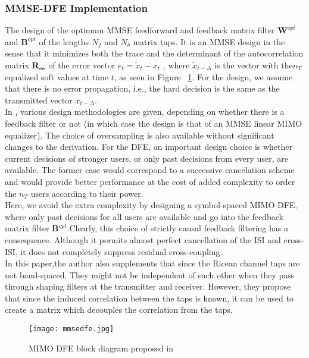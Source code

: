 \subsubsection{MMSE-DFE Implementation}
The design of the optimum MMSE feedforward and feedback matrix filter $\boldsymbol{W}^{opt}$ and $\boldsymbol{B}^{opt}$ of the lengths $N_f$ and $N_b$ matrix taps.
It is an MMSE design in the sense that it minimizes both the trace and the determinant of the autocorrelation matrix $\boldsymbol{R} _{\boldsymbol{ee}}$ of the error vector $e_t = \tilde{x} _t - x_t$ , where $ \tilde{x} _{t-\Delta} $ is the vector with the$n_T$ equalized soft values at time $t$, as seen in Figure ~\ref{fig:mmsedfe}. For the design, we assume that there is no error propagation, i.e., the hard decision is the same as the transmitted vector $x_{t-\Delta}$. \\
In \cite{finitemmsedfe}, various design methodologies are given, depending on whether there is a feedback filter or not (in which case the design is that of an MMSE linear MIMO equalizer). The choice of oversampling is also available without significant changes to the derivation. For the DFE, an important design choice is whether current decisions of stronger users, or only past decisions from every user, are available. The former case would correspond to a successive cancelation scheme and would provide better performance at the cost of added complexity to order the $n_T$ users according to their power. \\
Here, we avoid the extra complexity by designing a symbol-spaced MIMO DFE, where only past decisions for all users are available and go into the feedback matrix filter $\boldsymbol{B}^{opt}$.Clearly, this choice of strictly causal feedback filtering has a consequence. Although it permits almost perfect cancellation of the ISI and cross-ISI, it does not completely suppress residual cross-coupling. \\
In this paper,the author also supplements that since the Ricean channel taps are not baud-spaced. They might not be independent of each other when they pass through shaping filters at the transmitter and receiver. However, they propose that since the induced correlation between the taps is known, it can be used to create a matrix which decouples the correlation from the taps.
\begin{figure}[ht!]
\centering
\texttt{[image: mmsedfe.jpg]}
\caption{MIMO DFE block diagram proposed in \cite{komninakis} }
\label{fig:mmsedfe}
\end{figure}

